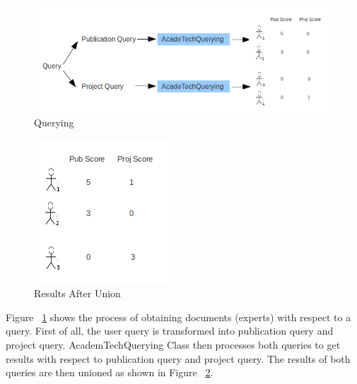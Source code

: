 \begin{figure}
\centering
\includegraphics[scale=0.7]{./figures/querying.png}
\caption{Querying} \label{fig:quering} 
\end{figure}
\quad
\begin{figure}
\centering
\includegraphics[scale=0.7]{./figures/union.png}
\caption{Results After Union} \label{fig:union} 
\end{figure}
Figure ~\ref{fig:quering} shows the process of obtaining documents (experts) with respect to a query. 
First of all, the user query is transformed into publication query and project
query. AcademTechQuerying Class then processes both queries to get results with respect to publication query and project query. The results of both
queries are then unioned as shown in Figure ~\ref{fig:union}.

